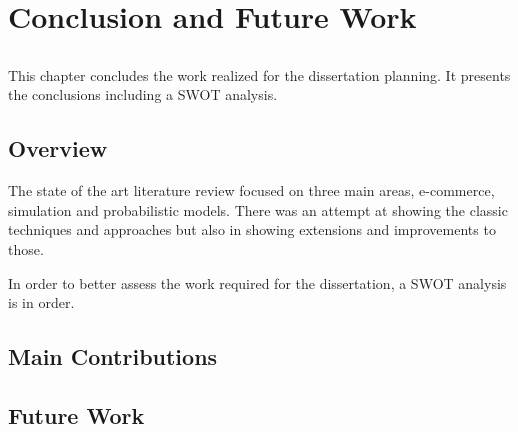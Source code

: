 \chapter{Conclusion and Future Work} \label{chap:conclusion}

\section*{}

This chapter concludes the work realized for the dissertation planning. It 
presents the conclusions including a SWOT analysis.

\section{Overview}

The state of the art literature review focused on three main areas, e-commerce, 
simulation and probabilistic models. There was an attempt at showing the 
classic techniques and approaches but also in showing extensions and 
improvements to those.

In order to better assess the work required for the dissertation, a SWOT 
analysis is in order.

% 
% 
% 
% 


\section{Main Contributions}

\section{Future Work}

